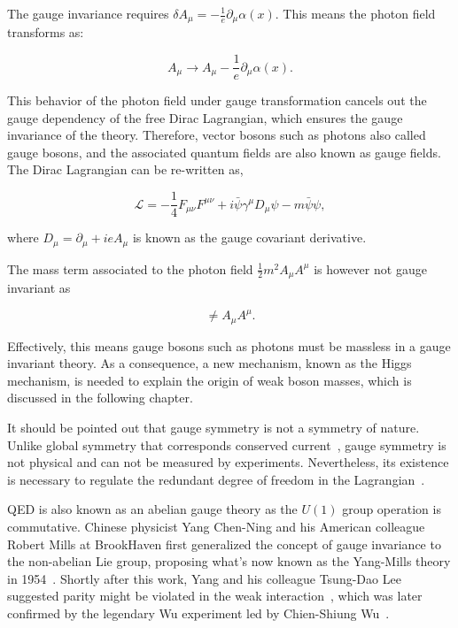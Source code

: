 The gauge invariance requires $\delta A_{\mu}=-\frac{1}{e}\partial_{\mu}\alpha(x)$. This means the photon field transforms as:

\begin{equation}
A_{\mu}\rightarrow A_{\mu}-\frac{1}{e}\partial_{\mu}\alpha(x).
\end{equation}

This behavior of the photon field under gauge transformation cancels out the gauge dependency of the free Dirac Lagrangian, which ensures the gauge invariance of the theory. Therefore, vector bosons such as photons also called gauge bosons, and the associated quantum fields are also known as gauge fields. The Dirac Lagrangian can be re-written as,

\begin{equation}
\label{eq:QEDCov}
\mathcal{L}=-\frac{1}{4}F_{\mu\nu}F^{\mu\nu}+i\bar{\psi}\gamma^{\mu}D_{\mu}\psi-m\bar{\psi}\psi,
\end{equation}

where $D_{\mu}=\partial_{\mu}+ieA_{\mu}$ is known as the gauge covariant derivative. 

The mass term associated to the photon field $\frac{1}{2}m^2A_{\mu}A^{\mu}$ is however not gauge invariant as

\begin{equation}
[A_{\mu}-\frac{1}{e}\partial_{\mu}\alpha(x)][A^{\mu}-\frac{1}{e}\partial^{\mu}\alpha(x)]\neq A_{\mu}A^{\mu}.
\end{equation}

Effectively, this means gauge bosons such as photons must be massless in a gauge invariant theory. As a consequence, a new mechanism, known as the Higgs mechanism, is needed to explain the origin of weak boson masses, which is discussed in the following chapter. 

It should be pointed out that gauge symmetry is not a symmetry of nature. Unlike global symmetry that corresponds conserved current~\cite{Noether1918}, gauge symmetry is not physical and can not be measured by experiments. Nevertheless, its existence is necessary to regulate the redundant degree of freedom in the Lagrangian~\cite{SCHWARTZ}. 

\ac{QED} is also known as an abelian gauge theory as the $U(1)$ group operation is commutative. Chinese physicist Yang Chen-Ning and his American colleague Robert Mills at BrookHaven first generalized the concept of gauge invariance to the non-abelian Lie group, proposing what's now known as the Yang-Mills theory in 1954~\cite{Yang:1954ek}. Shortly after this work, Yang and his colleague Tsung-Dao Lee suggested parity might be violated in the weak interaction~\cite{Lee:1956qn}, which was later confirmed by the legendary Wu experiment led by Chien-Shiung Wu~\cite{Wu:1957my}. 

